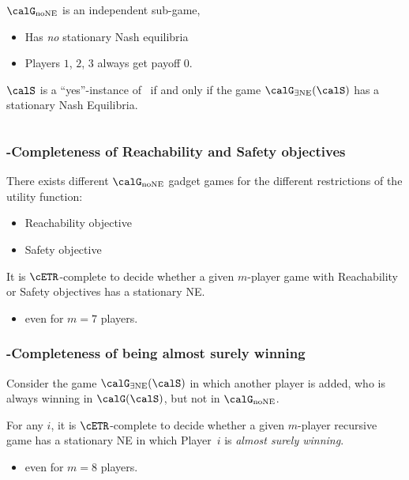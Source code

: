 \documentclass[english, aspectratio=169]{beamer}
\newcommand{\GexistsNE}{\ensuremath{\calG_{\exists \mathrm{NE}}}}
\newcommand{\GnoNE}{\ensuremath{\calG_{\mathrm{no NE}}}}
\newcommand{\cHomQuad}{\cCLASS{HomQuad}}
\begin{document}
\begin{frame}
\begin{columns}
    \begin{column}{0.45\textwidth}
      $\GnoNE$ is an independent sub-game,
      \begin{itemize}
      \item Has \emph{no} stationary Nash equilibria
      \item Players $1$, $2$, $3$ always get payoff $0$.
      \end{itemize}

      \pause \vspace{10pt}

      $\calS$ is a ``yes''-instance of \cHomQuad\ if and only if the game
      $\GexistsNE(\calS)$ has a stationary Nash Equilibria.
    \end{column}
  \end{columns}
\end{frame}

\begin{frame}
  \frametitle{\cETR-Completeness of Reachability and Safety objectives}
  
  There exists different $\GnoNE$ gadget games for the different restrictions of
  the utility function:
  \begin{itemize}
  \item Reachability objective
  \item Safety objective
  \end{itemize}

  \vspace{20pt}
  
  \begin{theorem}
    It is $\cETR$-complete to decide whether a given $m$-player game with
    Reachability or Safety objectives has a stationary NE.
    \begin{itemize}
    \item even for $m = 7$ players.
    \end{itemize}
  \end{theorem}

\end{frame}

\begin{frame}
  \frametitle{\cETR-Completeness of being almost surely winning}

  Consider the game $\GexistsNE(\calS)$ in which another player is added, who is
  always winning in $\calG(\calS)$, but not in $\GnoNE$.

  \vspace{20pt}

  \begin{theorem}
    For any $i$, it is $\cETR$-complete to decide whether a given $m$-player
    recursive game has a stationary NE in which Player~$i$ is \emph{almost
      surely winning}.
    \begin{itemize}
    \item even for $m = 8$ players.
    \end{itemize}

  \end{theorem}  
\end{frame}
\end{document}
